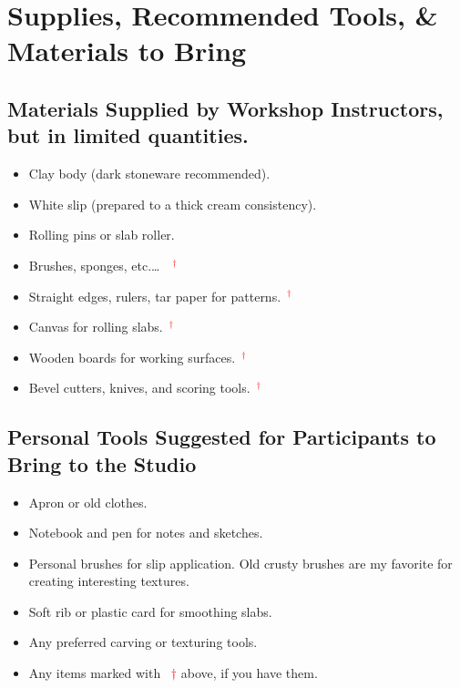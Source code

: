 \documentclass[12pt]{scrartcl}
\begin{document}
\clearpage
\section*{Supplies, Recommended Tools, \& Materials to Bring}

\subsection*{Materials Supplied by Workshop Instructors, but in limited quantities.}
\begin{itemize}
  \item Clay body (dark stoneware recommended).
  \item White slip (prepared to a thick cream consistency).
  \item Rolling pins or slab roller.
  \item Brushes, sponges, etc.\ldots~\textcolor{red}{~\textcolor{red}{$^\dagger$}}
  \item Straight edges, rulers, tar paper for patterns.~\textcolor{red}{$^\dagger$}
  \item Canvas for rolling slabs.~\textcolor{red}{$^\dagger$}
  \item Wooden boards for working surfaces.~\textcolor{red}{$^\dagger$}
  \item Bevel cutters, knives, and scoring tools.~\textcolor{red}{$^\dagger$}
\end{itemize}

\subsection*{Personal Tools Suggested for Participants to Bring to the Studio}
\begin{itemize}
  \item Apron or old clothes.
  \item Notebook and pen for notes and sketches.
  \item Personal brushes for slip application.  Old crusty brushes are my favorite for creating interesting textures.
  \item Soft rib or plastic card for smoothing slabs.
  \item Any preferred carving or texturing tools.
  \item Any items marked with ~\textcolor{red}{$\dagger$} above, if you have them.
\end{itemize}
\end{document}
